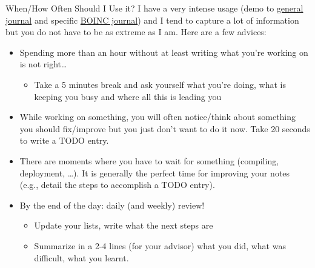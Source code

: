 \documentclass[xcolor=x11names,compress,8pt]{beamer}
\renewcommand{\(}{\begin{columns}}
\renewcommand{\)}{\end{columns}}
\newcommand{\<}[1]{\begin{column}{#1}}
\renewcommand{\>}{\end{column}}
\begin{document}
\begin{frame}[label=sec-3-2-3]{When/How Often Should I Use it?}
I have a very intense usage (demo to \alert{\href{file:///Users/jvincent/org/journal.org}{general journal}} and specific
\alert{\href{file:///Users/jvincent/Work/Documents/Articles/2013/2013_boinc_response_time_optimization/journal.org}{BOINC journal}}) and I tend to capture a lot of information but you do
not have to be as extreme as I am. Here are a few advices:

\begin{itemize}
\item Spending \alert{more than an hour without} at least \alert{writing} what you're
working on \alert{is not right}\ldots{}
\begin{itemize}
\item \alert{Take a 5 minutes} break and ask yourself what you're doing, what is
keeping you busy and where all this is leading you
\end{itemize}
\item While working on something, you will often notice/think about
something you should fix/improve but you just don't want to do it
now. Take 20 seconds to write a \alert{TODO} entry.
\item There are moments where you have to \alert{wait for something} (compiling,
deployment, \ldots{}). It is generally the perfect time for improving
your notes (e.g., detail the steps to accomplish a TODO entry).
\item \alert{By the end of the day}: daily (and weekly) \alert{review!}
\begin{itemize}
\item Update your lists, write what the next steps are
\item \alert{Summarize in a 2-4 lines} (for your advisor) what you did, what was
difficult, what you learnt.
\end{itemize}
\end{itemize}
\end{frame}
\end{document}
